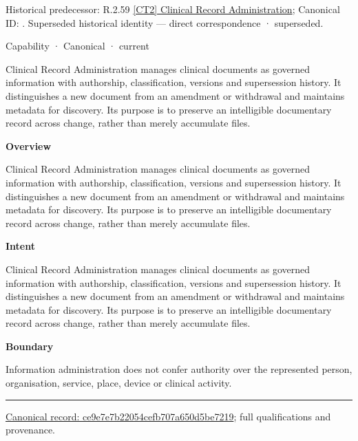 {\small Historical predecessor: R.2.59 \hyperref[element:be3f2e695eda403fbce8118daf83d386]{[CT2] Clinical Record Administration}; Canonical ID: \texttt{}. Superseded historical identity — direct correspondence · superseded.}\par
\label{element:ce9e7e7b22054cefb707a650d5be7219}
{\small Capability · Canonical · current}\par

Clinical Record Administration manages clinical documents as governed information with authorship, classification, versions and supersession history. It distinguishes a new document from an amendment or withdrawal and maintains metadata for discovery. Its purpose is to preserve an intelligible documentary record across change, rather than merely accumulate files.



\textbf{Overview}



Clinical Record Administration manages clinical documents as governed information with authorship, classification, versions and supersession history. It distinguishes a new document from an amendment or withdrawal and maintains metadata for discovery. Its purpose is to preserve an intelligible documentary record across change, rather than merely accumulate files.



\textbf{Intent}



Clinical Record Administration manages clinical documents as governed information with authorship, classification, versions and supersession history. It distinguishes a new document from an amendment or withdrawal and maintains metadata for discovery. Its purpose is to preserve an intelligible documentary record across change, rather than merely accumulate files.



\textbf{Boundary}



Information administration does not confer authority over the represented person, organisation, service, place, device or clinical activity.



\medskip\hrule\medskip

{\footnotesize \href{../../../../continuum/strategy/capability/ce9e7e7b22054cefb707a650d5be7219.md}{Canonical record: ce9e7e7b22054cefb707a650d5be7219}; full qualifications and provenance.}\par
